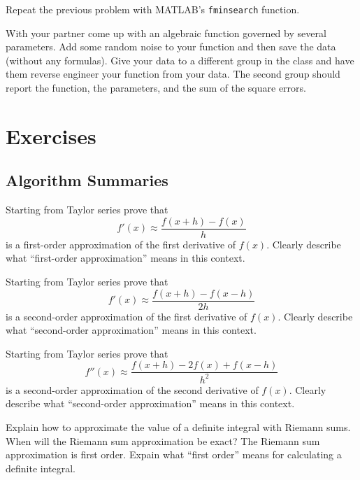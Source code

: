 \begin{problem}
    Repeat the previous problem with MATLAB's \texttt{fminsearch} function.
\end{problem}

\begin{problem}
    With your partner come up with an algebraic function governed by several parameters.
    Add some random noise to your function and then save the data (without any formulas).
    Give your data to a different group in the class and have them reverse engineer your
    function from your data.  The second group should report the function, the parameters,
    and the sum of the square errors.
\end{problem}





\newpage\section{Exercises}

\subsection{Algorithm Summaries}

\begin{problem}
    Starting from Taylor series prove that 
    \[ f'(x) \approx \frac{f(x+h) - f(x)}{h} \]
    is a first-order approximation of the first derivative of $f(x)$.  Clearly describe
    what ``first-order approximation'' means in this context.
\end{problem}

\begin{problem}
    Starting from Taylor series prove that 
    \[ f'(x) \approx \frac{f(x+h) - f(x-h)}{2h} \]
    is a second-order approximation of the first derivative of $f(x)$.  Clearly describe
    what ``second-order approximation'' means in this context.
\end{problem}

\begin{problem}
    Starting from Taylor series prove that 
    \[ f''(x) \approx \frac{f(x+h) - 2f(x) + f(x-h)}{h^2} \]
    is a second-order approximation of the second derivative of $f(x)$.  Clearly describe
    what ``second-order approximation'' means in this context.
\end{problem}

\begin{problem}
    Explain how to approximate the value of a definite integral with Riemann sums.  When
    will the Riemann sum approximation be exact?  The Riemann sum approximation is first
    order.  Expain what ``first order'' means for calculating a definite integral. 
\end{problem}

